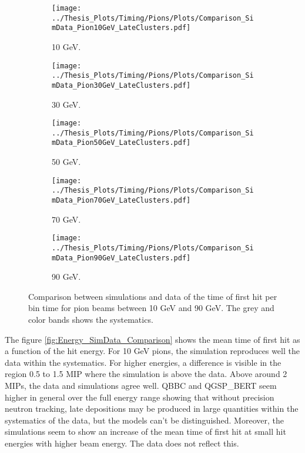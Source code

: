 \begin{figure}[htbp!]
	\begin{subfigure}[t]{0.5\textwidth}
		\centering
		\texttt{[image: ../Thesis\_Plots/Timing/Pions/Plots/Comparison\_SimData\_Pion10GeV\_LateClusters.pdf]}
		\caption{10 GeV.} \label{fig:dNdt_SimData_10GeV}
	\end{subfigure}
	\hfill
	\begin{subfigure}[t]{0.5\textwidth}
		\centering
		\texttt{[image: ../Thesis\_Plots/Timing/Pions/Plots/Comparison\_SimData\_Pion30GeV\_LateClusters.pdf]}
		\caption{30 GeV.}\label{fig:dNdt_SimData_30GeV}
	\end{subfigure}
	\begin{subfigure}[t]{0.5\textwidth}
		\centering
		\texttt{[image: ../Thesis\_Plots/Timing/Pions/Plots/Comparison\_SimData\_Pion50GeV\_LateClusters.pdf]}
		\caption{50 GeV.} \label{fig:dNdt_SimData_50GeV}
	\end{subfigure}
	\hfill
	\begin{subfigure}[t]{0.5\textwidth}
		\centering
		\texttt{[image: ../Thesis\_Plots/Timing/Pions/Plots/Comparison\_SimData\_Pion70GeV\_LateClusters.pdf]}
		\caption{70 GeV.} \label{fig:dNdt_SimData_70GeV}
	\end{subfigure}
	\hfill
	\begin{subfigure}[t]{0.5\textwidth}
		\centering
		\texttt{[image: ../Thesis\_Plots/Timing/Pions/Plots/Comparison\_SimData\_Pion90GeV\_LateClusters.pdf]}
		\caption{90 GeV.} \label{fig:dNdt_SimData_90GeV}
	\end{subfigure}
	\caption{Comparison between simulations and data of the time of first hit per bin time for pion beams between 10 GeV and 90 GeV. The grey and color bands shows the systematics.}
	\label{fig:dNdt_SimData_Comparison}
\end{figure}

The figure \ref{fig:Energy_SimData_Comparison} shows the mean time of first hit as a function of the hit energy. For 10 GeV pions, the simulation reproduces well the data within the systematics. For higher energies, a difference is visible in the region 0.5 to 1.5 MIP where the simulation is above the data. Above around 2 MIPs, the data and simulations agree well. QBBC and QGSP\_BERT seem higher in general over the full energy range showing that without precision neutron tracking, late depositions may be produced in large quantities within the systematics of the data, but the models can't be distinguished.
Moreover, the simulations seem to show an increase of the mean time of first hit at small hit energies with higher beam energy. The data does not reflect this.

